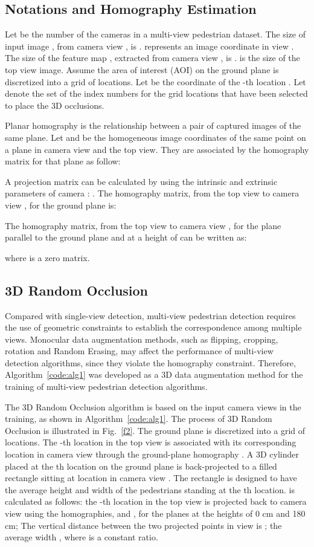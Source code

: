 \documentclass[runningheads]{llncs}
\begin{document}
	\subsection{Notations and Homography Estimation}
	Let  be the number of the cameras in a multi-view pedestrian dataset. The size of input image , from camera view  , is .  represents an image coordinate in view . The size of the feature map , extracted from camera view , is .  is the size of the top view image. Assume the area of interest (AOI) on the ground plane is discretized into a grid of  locations. Let  be the coordinate of the -th location . Let  denote the set of the index numbers for the grid locations that have been selected to place the 3D occlusions.
	
	Planar homography is the relationship between a pair of captured images of the same plane.	
	Let  and  be the homogeneous image coordinates of the same point on a plane in  camera view  and the top view. They are associated by the homography matrix  for that plane as follow:
	


	A  projection matrix can be calculated by using the intrinsic and extrinsic parameters of  camera : . 	
	The homography matrix, from the top view  to camera view , for the ground plane is:
	
	
	The homography matrix, from the top view  to camera view , for the plane parallel to the ground plane and at a height of  can be written as:
	
	where  is a  zero matrix.
	
	
	
	\subsection{3D Random Occlusion}		
	Compared with single-view detection, multi-view pedestrian detection requires the use of geometric constraints to establish the correspondence among multiple views. Monocular data augmentation methods, such as flipping,  cropping, rotation and Random Erasing, may affect the performance of multi-view detection algorithms, since they violate the homography constraint. Therefore, Algorithm~\ref{code:alg1} was developed as a 3D data augmentation method for the training of multi-view pedestrian detection algorithms.
	
	The 3D Random Occlusion algorithm is based on the input camera views in the training, as shown in Algorithm~\ref{code:alg1}. The process of 3D Random Occlusion is illustrated in Fig.~\ref{f2}. The ground plane is discretized into a grid of locations. The -th location  in the top view is associated with its corresponding location  in camera view   through the ground-plane homography . A 3D cylinder placed at the th location on the ground plane is back-projected to a filled rectangle  sitting at location  in camera view . The rectangle is designed to have the average height  and width  of the pedestrians standing at the th location.  is calculated as follows: the -th location in the top view is projected back to camera view  using the homographies,  and , for the planes at the heights of 0 cm and 180 cm; The vertical distance between the two projected points in view  is ; the average width , where  is a constant ratio.
	
\end{document}
